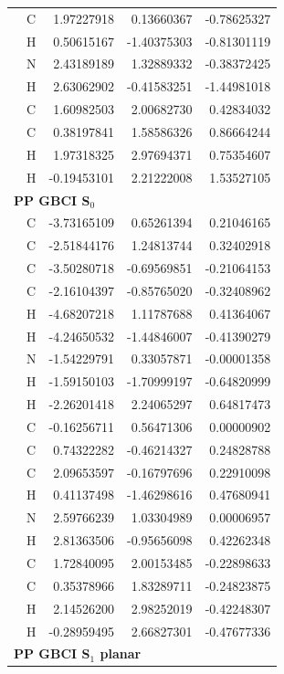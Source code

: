 \begin{longtable}{llrrr}
 & C &  1.97227918 &  0.13660367 & -0.78625327 \\
 & H &  0.50615167 & -1.40375303 & -0.81301119 \\
 & N &  2.43189189 &  1.32889332 & -0.38372425 \\
 & H &  2.63062902 & -0.41583251 & -1.44981018 \\
 & C &  1.60982503 &  2.00682730 &  0.42834032 \\
 & C &  0.38197841 &  1.58586326 &  0.86664244 \\
 & H &  1.97318325 &  2.97694371 &  0.75354607 \\
 & H & -0.19453101 &  2.21222008 &  1.53527105 \\
\multicolumn{5}{l}{\textbf{PP GBCI S$_0$}}\\
 & C & -3.73165109 &  0.65261394 &  0.21046165 \\
 & C & -2.51844176 &  1.24813744 &  0.32402918 \\
 & C & -3.50280718 & -0.69569851 & -0.21064153 \\
 & C & -2.16104397 & -0.85765020 & -0.32408962 \\
 & H & -4.68207218 &  1.11787688 &  0.41364067 \\
 & H & -4.24650532 & -1.44846007 & -0.41390279 \\
 & N & -1.54229791 &  0.33057871 & -0.00001358 \\
 & H & -1.59150103 & -1.70999197 & -0.64820999 \\
 & H & -2.26201418 &  2.24065297 &  0.64817473 \\
 & C & -0.16256711 &  0.56471306 &  0.00000902 \\
 & C &  0.74322282 & -0.46214327 &  0.24828788 \\
 & C &  2.09653597 & -0.16797696 &  0.22910098 \\
 & H &  0.41137498 & -1.46298616 &  0.47680941 \\
 & N &  2.59766239 &  1.03304989 &  0.00006957 \\
 & H &  2.81363506 & -0.95656098 &  0.42262348 \\
 & C &  1.72840095 &  2.00153485 & -0.22898633 \\
 & C &  0.35378966 &  1.83289711 & -0.24823875 \\
 & H &  2.14526200 &  2.98252019 & -0.42248307 \\
 & H & -0.28959495 &  2.66827301 & -0.47677336 \\
\multicolumn{5}{l}{\textbf{PP GBCI S$_1$ planar}}\\

\end{longtable}

